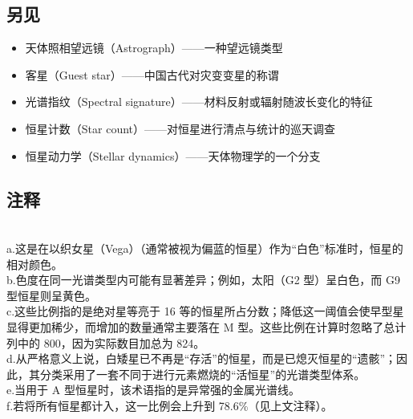 \subsection{另见}
\begin{itemize}
\item 天体照相望远镜（Astrograph）——一种望远镜类型
\item 客星（Guest star）——中国古代对灾变变星的称谓
\item 光谱指纹（Spectral signature）——材料反射或辐射随波长变化的特征
\item 恒星计数（Star count）——对恒星进行清点与统计的巡天调查
\item 恒星动力学（Stellar dynamics）——天体物理学的一个分支
\end{itemize}
\subsection{注释}\\
a.这是在以织女星（Vega）（通常被视为偏蓝的恒星）作为“白色”标准时，恒星的相对颜色。\\
b.色度在同一光谱类型内可能有显著差异；例如，太阳（G2 型）呈白色，而 G9 型恒星则呈黄色。\\
c.这些比例指的是绝对星等亮于 16 等的恒星所占分数；降低这一阈值会使早型星显得更加稀少，而增加的数量通常主要落在 M 型。这些比例在计算时忽略了总计列中的 800，因为实际数目加总为 824。\\
d.从严格意义上说，白矮星已不再是“存活”的恒星，而是已熄灭恒星的“遗骸”；因此，其分类采用了一套不同于进行元素燃烧的“活恒星”的光谱类型体系。\\
e.当用于 A 型恒星时，该术语指的是异常强的金属光谱线。\\
f.若将所有恒星都计入，这一比例会上升到 78.6\%（见上文注释）。
